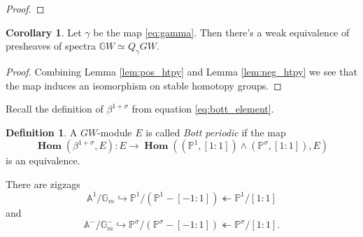 \documentclass[edeposit,fullpage]{uiucthesis2009}
\newcommand{\Z}{\mathbb Z}
\newcommand{\mbb}{\mathbb}
\DeclareMathOperator{\iHom}{\mathbf{Hom}}
\theoremstyle{plain}
\numberwithin{lemma}{section}
\theoremstyle{definition}
\newtheorem{corollary}[lemma]{Corollary}
\newtheorem{definition}[lemma]{Definition}
\begin{document}
\begin{proof}

 \end{proof}

\begin{corollary}\label{cor:GW_per}
Let $\gamma$ be the map \eqref{eq:gamma}. Then there's a weak
equivalence of presheaves of spectra $\mbb GW \simeq Q_\gamma GW$.
\end{corollary}

\begin{proof}
Combining Lemma \ref{lem:pos_htpy} and Lemma \ref{lem:neg_htpy} we see
that the map induces an isomorphism on stable homotopy groups. 
\end{proof}




Recall the definition of $\beta^{1+\sigma}$ from equation
\eqref{eq:bott_element}.

\begin{definition}
A $GW$-module $E$ is called \emph{Bott periodic} if the map
\[
\iHom(\beta^{1+\sigma},E): E
\rightarrow \iHom((\mbb P^1,[1:1])\wedge (\mbb P^\sigma,[1:1]),E)
\]
is an equivalence.
\end{definition}

There are zigzags
\[
\mbb A^1/\mbb G_m \hookrightarrow \mbb P^1/(\mbb P^1 - [-1:1])
\twoheadleftarrow \mbb P^1/[1:1]
\]
and 
\[
\mbb A^-/\mbb G_m^- \hookrightarrow \mbb P^\sigma/(\mbb P^\sigma - [-1:1])
\twoheadleftarrow \mbb P^\sigma/[1:1].
\]
\end{document}
